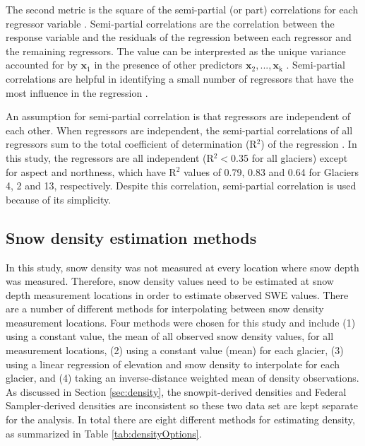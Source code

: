 \documentclass{sfuthesis}
\renewcommand{\vector}[1]{\mathbf{#1}}
\begin{document}
The second metric is the square of the semi-partial (or part) correlations for each regressor variable \citep{Gromping2015}. Semi-partial correlations are the correlation between the response variable and the residuals of the regression between each regressor and the remaining regressors. The value can be interprested as the unique variance accounted for by $\vector{x}_1$ in the presence of other predictors $\vector{x}_2,...,\vector{x}_\mathrm{k}$ \citep{Darlington1968, Bring1996}. Semi-partial correlations are helpful in identifying a small number of regressors that have the most influence in the regression \citep{Gromping2009}.

An assumption for semi-partial correlation is that regressors are independent of each other. When regressors are independent, the semi-partial correlations of all regressors sum to the total coefficient of determination (R$^2$) of the regression  \citep{Gromping2015}. In this study, the regressors are all independent (R$^2<$0.35 for all glaciers) except for aspect and northness, which have R$^2$ values of 0.79, 0.83 and 0.64 for Glaciers 4, 2 and 13, respectively. Despite this correlation, semi-partial correlation is used because of its simplicity. 

\subsection{Snow density estimation methods}
\label{sec:densityoptions}
In this study, snow density was not measured at every location where snow depth was measured. Therefore, snow density values need to be estimated at snow depth measurement locations in order to estimate observed SWE values. There are a number of different methods for interpolating between snow density measurement locations. Four methods were chosen for this study and include (1) using a constant value, the mean of all observed snow density values, for all measurement locations, (2) using a constant value (mean) for each glacier, (3) using a linear regression of elevation and snow density to interpolate for each glacier, and (4) taking an inverse-distance weighted mean of density observations. As discussed in Section \ref{sec:density}, the snowpit-derived densities and Federal Sampler-derived densities are inconsistent so these two data set are kept separate for the analysis. In total there are eight different methods for estimating density, as summarized in Table \ref{tab:densityOptions}.
\end{document}

